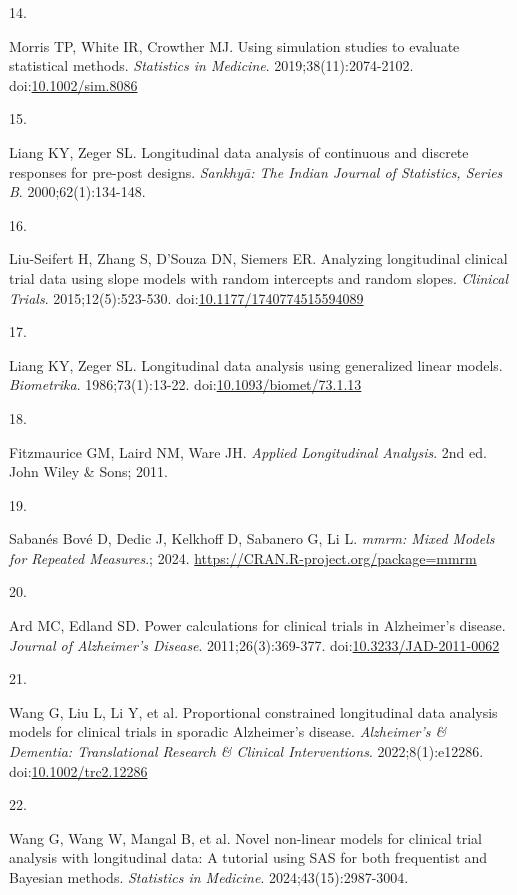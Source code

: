 \documentclass[
  11pt,
]{article}
\newlength{\cslhangindent}
\newlength{\csllabelwidth}
\newenvironment{CSLReferences}[2] %
 {\begin{list}{}{%
  \setlength{\itemindent}{0pt}
  \setlength{\leftmargin}{0pt}
  \setlength{\parsep}{0pt}
  \ifodd #1
   \setlength{\leftmargin}{\cslhangindent}
   \setlength{\itemindent}{-1\cslhangindent}
  \fi
  \setlength{\itemsep}{#2\baselineskip}}}
 {\end{list}}
\newcommand{\CSLLeftMargin}[1]{\parbox[t]{\csllabelwidth}{\strut#1\strut}}
\newcommand{\CSLRightInline}[1]{\parbox[t]{\linewidth - \csllabelwidth}{\strut#1\strut}}
\begin{document}
\begin{CSLReferences}{0}{1}
\CSLLeftMargin{14. }%
\CSLRightInline{Morris TP, White IR, Crowther MJ. Using simulation studies to evaluate statistical methods. \emph{Statistics in Medicine}. 2019;38(11):2074-2102. doi:\href{https://doi.org/10.1002/sim.8086}{10.1002/sim.8086}}

\CSLLeftMargin{15. }%
\CSLRightInline{Liang KY, Zeger SL. Longitudinal data analysis of continuous and discrete responses for pre-post designs. \emph{Sankhyā: The Indian Journal of Statistics, Series B}. 2000;62(1):134-148.}

\CSLLeftMargin{16. }%
\CSLRightInline{Liu-Seifert H, Zhang S, D'Souza DN, Siemers ER. Analyzing longitudinal clinical trial data using slope models with random intercepts and random slopes. \emph{Clinical Trials}. 2015;12(5):523-530. doi:\href{https://doi.org/10.1177/1740774515594089}{10.1177/1740774515594089}}

\CSLLeftMargin{17. }%
\CSLRightInline{Liang KY, Zeger SL. Longitudinal data analysis using generalized linear models. \emph{Biometrika}. 1986;73(1):13-22. doi:\href{https://doi.org/10.1093/biomet/73.1.13}{10.1093/biomet/73.1.13}}

\CSLLeftMargin{18. }%
\CSLRightInline{Fitzmaurice GM, Laird NM, Ware JH. \emph{Applied Longitudinal Analysis}. 2nd ed. John Wiley \& Sons; 2011.}

\CSLLeftMargin{19. }%
\CSLRightInline{Sabanés Bové D, Dedic J, Kelkhoff D, Sabanero G, Li L. \emph{{mmrm}: Mixed Models for Repeated Measures}.; 2024. \url{https://CRAN.R-project.org/package=mmrm}}

\CSLLeftMargin{20. }%
\CSLRightInline{Ard MC, Edland SD. Power calculations for clinical trials in {Alzheimer's} disease. \emph{Journal of Alzheimer's Disease}. 2011;26(3):369-377. doi:\href{https://doi.org/10.3233/JAD-2011-0062}{10.3233/JAD-2011-0062}}

\CSLLeftMargin{21. }%
\CSLRightInline{Wang G, Liu L, Li Y, et al. Proportional constrained longitudinal data analysis models for clinical trials in sporadic {Alzheimer's} disease. \emph{Alzheimer's \& Dementia: Translational Research \& Clinical Interventions}. 2022;8(1):e12286. doi:\href{https://doi.org/10.1002/trc2.12286}{10.1002/trc2.12286}}

\CSLLeftMargin{22. }%
\CSLRightInline{Wang G, Wang W, Mangal B, et al. Novel non-linear models for clinical trial analysis with longitudinal data: A tutorial using {SAS} for both frequentist and {Bayesian} methods. \emph{Statistics in Medicine}. 2024;43(15):2987-3004.}

\end{CSLReferences}
\end{document}
